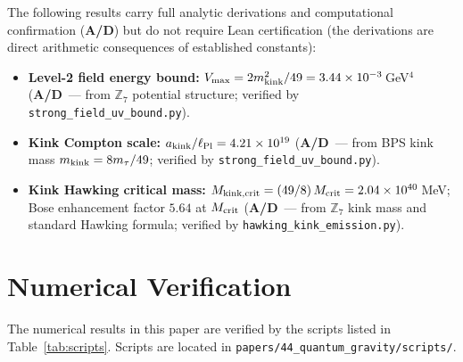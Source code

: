 \documentclass[11pt]{article}
\theoremstyle{remark}
\newcommand{\CatAD}{\textbf{A/D}}
\begin{document}
\begin{appendices}
{The following results carry full analytic derivations and computational confirmation
(\CatAD) but do not require Lean certification (the derivations are direct arithmetic
consequences of established constants):

\begin{itemize}[noitemsep]
\item \textbf{Level-2 field energy bound:}
  $V_{\rm max} = 2m_{\rm kink}^2/49 = 3.44\times10^{-3}$\,GeV$^4$
  (\CatAD\ --- from $\mathbb{Z}_7$ potential structure; verified by
  \texttt{strong\_field\_uv\_bound.py}).
\item \textbf{Kink Compton scale:}
  $a_{\rm kink}/\ell_{\rm Pl} = 4.21\times10^{19}$
  (\CatAD\ --- from BPS kink mass $m_{\rm kink}=8m_\tau/49$; verified by
  \texttt{strong\_field\_uv\_bound.py}).
\item \textbf{Kink Hawking critical mass:}
  $M_{\rm kink,crit} = (49/8)\,M_{\rm crit} = 2.04\times10^{40}$\,MeV;
  Bose enhancement factor $5.64$ at $M_{\rm crit}$
  (\CatAD\ --- from $\mathbb{Z}_7$ kink mass and standard Hawking formula; verified by
  \texttt{hawking\_kink\_emission.py}).
\end{itemize}
} %

\section{Numerical Verification}
\label{app:scripts}

The numerical results in this paper are verified by the scripts listed in
Table~\ref{tab:scripts}.  Scripts are located in \texttt{papers/44\_quantum\_gravity/scripts/}.


\end{appendices}
\end{document}
